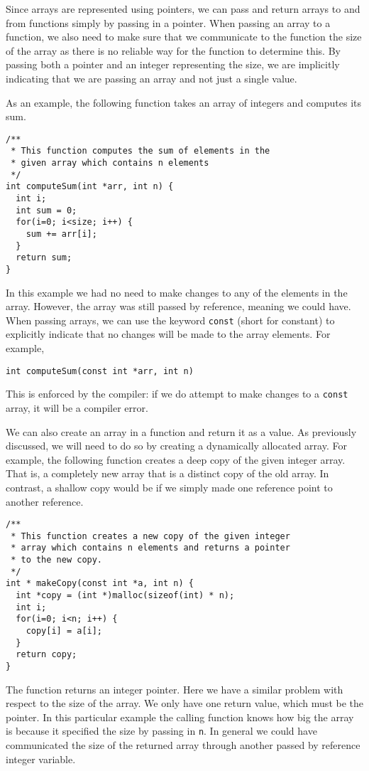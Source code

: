 Since arrays are represented using pointers, we can pass and
return arrays to and from functions simply by passing in a pointer.
When passing an array to a function, we also need to make sure
that we communicate to the function the size of the array as there
is no reliable way for the function to determine this.  By passing
both a pointer and an integer representing the size, we are implicitly
indicating that we are passing an array and not just a single value.

As an example, the following function takes an array of integers
and computes its sum.

\begin{verbatim}
/**
 * This function computes the sum of elements in the
 * given array which contains n elements
 */
int computeSum(int *arr, int n) {
  int i;
  int sum = 0;
  for(i=0; i<size; i++) {
    sum += arr[i];
  }
  return sum;
}
\end{verbatim}

In this example we had no need to make changes to any of the elements
in the array.  However, the array was still passed by reference, meaning
we could have.  When passing arrays, we can use the keyword 
\texttt{const} (short for constant) to explicitly indicate that no changes will be made
to the array elements.  For example, 

\texttt{int computeSum(const int *arr, int n)}

This is enforced by the compiler: if we do attempt
to make changes to a \texttt{const} array, it will be a compiler
error.

We can also create an array in a function and return it as 
a value.  As previously discussed, we will need to do so by 
creating a dynamically allocated array.  For example, the 
following function creates a \gls{deep copy} of the given 
integer array.  That is, a completely new array that is a distinct 
copy of the old array.  In contrast, a \gls{shallow copy}
would be if we simply made one reference point to another 
reference.


\begin{verbatim}
/**
 * This function creates a new copy of the given integer
 * array which contains n elements and returns a pointer
 * to the new copy.
 */
int * makeCopy(const int *a, int n) {
  int *copy = (int *)malloc(sizeof(int) * n);
  int i;
  for(i=0; i<n; i++) {
    copy[i] = a[i];
  }
  return copy;
}
\end{verbatim}

The function returns an integer pointer.  Here we have a similar problem
with respect to the size of the array.  We only have one return value, which
must be the pointer.  In this particular example the calling function knows
how big the array is because it specified the size by passing in \texttt{n}.
In general we could have communicated the size of the returned array 
through another passed by reference integer variable.

